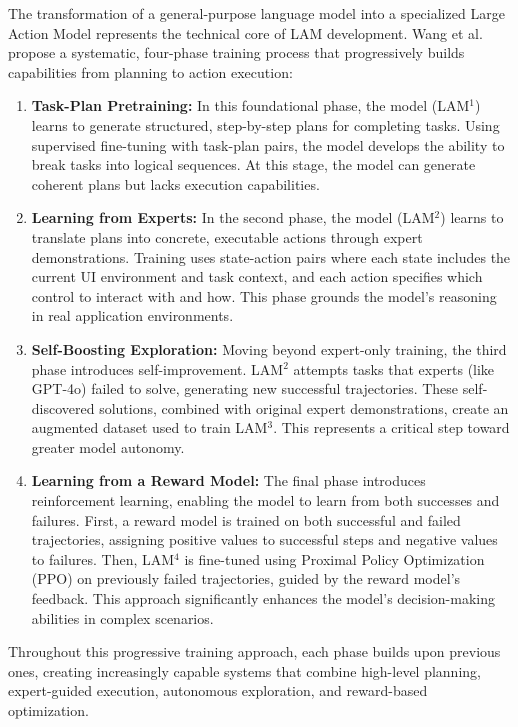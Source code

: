 \documentclass[journal,twoside,10pt]{IEEEtran}
\begin{document}
The transformation of a general-purpose language model into a specialized Large Action Model represents the technical core of LAM development. Wang et al. \cite{wang2023lam} propose a systematic, four-phase training process that progressively builds capabilities from planning to action execution:

\begin{enumerate}
    \item \textbf{Task-Plan Pretraining:} In this foundational phase, the model (LAM$^1$) learns to generate structured, step-by-step plans for completing tasks. Using supervised fine-tuning with task-plan pairs, the model develops the ability to break tasks into logical sequences. At this stage, the model can generate coherent plans but lacks execution capabilities.
    
    \item \textbf{Learning from Experts:} In the second phase, the model (LAM$^2$) learns to translate plans into concrete, executable actions through expert demonstrations. Training uses state-action pairs where each state includes the current UI environment and task context, and each action specifies which control to interact with and how. This phase grounds the model's reasoning in real application environments.
    
    \item \textbf{Self-Boosting Exploration:} Moving beyond expert-only training, the third phase introduces self-improvement. LAM$^2$ attempts tasks that experts (like GPT-4o) failed to solve, generating new successful trajectories. These self-discovered solutions, combined with original expert demonstrations, create an augmented dataset used to train LAM$^3$. This represents a critical step toward greater model autonomy.
    
    \item \textbf{Learning from a Reward Model:} The final phase introduces reinforcement learning, enabling the model to learn from both successes and failures. First, a reward model is trained on both successful and failed trajectories, assigning positive values to successful steps and negative values to failures. Then, LAM$^4$ is fine-tuned using Proximal Policy Optimization (PPO) on previously failed trajectories, guided by the reward model's feedback. This approach significantly enhances the model's decision-making abilities in complex scenarios.
\end{enumerate}

Throughout this progressive training approach, each phase builds upon previous ones, creating increasingly capable systems that combine high-level planning, expert-guided execution, autonomous exploration, and reward-based optimization.
\end{document}
